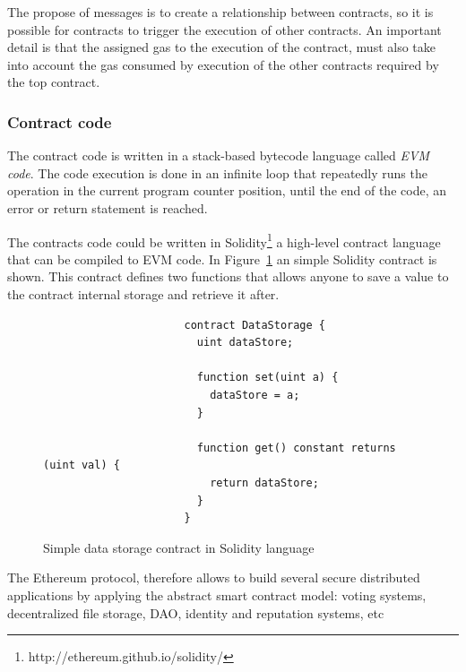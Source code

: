 The propose of messages is to create a relationship between contracts, so it is possible for contracts to trigger the execution of other contracts.
An important detail is that the assigned gas to the execution of the contract,
must also take into account the gas consumed by execution of the other contracts required by the top contract.

\subsubsection{Contract code} The contract code is written in a stack-based bytecode language called \textit{\ac{EVM} code}.
The code execution is done in an infinite loop that repeatedly runs the operation in the current program counter position, until the end of the code, an error or return statement is reached.

The contracts code could be written in Solidity\footnote{http://ethereum.github.io/solidity/} a high-level contract language that can be compiled to \ac{EVM} code.
In Figure~\ref{fig:solidity-example} an simple Solidity contract is shown.
This contract defines two functions that allows anyone to save a value to the contract internal storage and retrieve it after.

\begin{figure}[h!]
  \centering
                    \begin{Verbatim}
                      contract DataStorage {
                        uint dataStore;

                        function set(uint a) {
                          dataStore = a;
                        }

                        function get() constant returns (uint val) {
                          return dataStore;
                        }
                      }
                    \end{Verbatim}
  \caption{Simple data storage contract in Solidity language}
\label{fig:solidity-example}
\end{figure}

The Ethereum protocol, therefore allows to build several secure distributed applications by applying the abstract smart contract model: voting systems, decentralized file storage, \ac{DAO}, identity and reputation systems, etc

